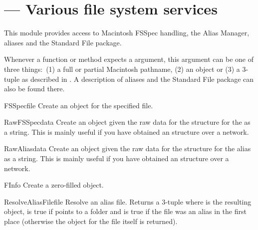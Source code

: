 \section{ ---
         Various file system services}



This module provides access to Macintosh FSSpec handling, the Alias
Manager,  aliases and the Standard File package.

Whenever a function or method expects a  argument, this
argument can be one of three things:\ (1) a full or partial Macintosh
pathname, (2) an  object or (3) a 3-tuple  as described in . A description of aliases and the Standard File
package can also be found there.

\begin{funcdesc}{FSSpec}{file}
Create an  object for the specified file.
\end{funcdesc}

\begin{funcdesc}{RawFSSpec}{data}
Create an  object given the raw data for the \C{}
structure for the  as a string.  This is mainly useful
if you have obtained an  structure over a network.
\end{funcdesc}

\begin{funcdesc}{RawAlias}{data}
Create an  object given the raw data for the \C{}
structure for the alias as a string.  This is mainly useful if you
have obtained an  structure over a network.
\end{funcdesc}

\begin{funcdesc}{FInfo}{}
Create a zero-filled  object.
\end{funcdesc}

\begin{funcdesc}{ResolveAliasFile}{file}
Resolve an alias file. Returns a 3-tuple  where  is the resulting
 object,  is true if  points
to a folder and  is true if the file was an alias in the
first place (otherwise the  object for the file itself
is returned).
\end{funcdesc}

